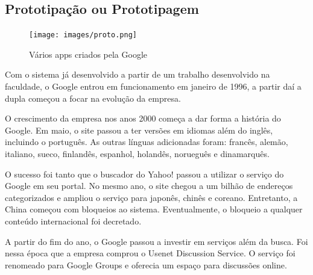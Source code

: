 \documentclass[a4paper]{article}
\begin{document}
\subsection{Prototipação ou Prototipagem}
\begin{figure}[h]
    \centering
    \texttt{[image: images/proto.png]}\\[0.5cm]
    \caption{Vários apps criados pela Google}
\end{figure}
\par Com o sistema já desenvolvido a partir de um trabalho desenvolvido na faculdade, o Google entrou em funcionamento em janeiro de 1996, a partir daí a dupla começou a focar na evolução da empresa.
\par O crescimento da empresa nos anos 2000 começa a dar forma a história do Google. Em maio, o site passou a ter versões em idiomas além do inglês, incluindo o português. As outras línguas adicionadas foram: francês, alemão, italiano, sueco, finlandês, espanhol, holandês, norueguês e dinamarquês.
\par O sucesso foi tanto que o buscador do Yahoo! passou a utilizar o serviço do Google em seu portal. No mesmo ano, o site chegou a um bilhão de endereços categorizados e ampliou o serviço para japonês, chinês e coreano. Entretanto, a China começou com bloqueios ao sistema. Eventualmente, o bloqueio a qualquer conteúdo internacional foi decretado.
\par A partir do fim do ano, o Google passou a investir em serviços além da busca. Foi nessa época que a empresa comprou o Usenet Discussion Service. O serviço foi renomeado para Google Groups e oferecia um espaço para discussões online.
\end{document}
